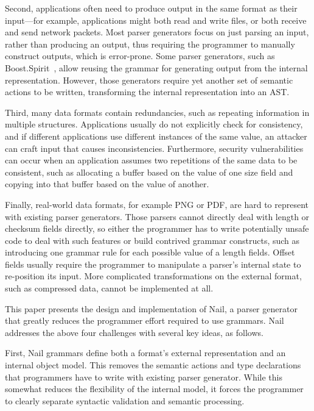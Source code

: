 Second,  applications often need to produce output in the same
format as their input---for example, applications might both
read and write files, or both receive and send network packets.
Most parser generators focus on just parsing an input, rather
than producing an output, thus requiring the programmer to manually
construct outputs, which is error-prone.  Some parser generators, such as
Boost.Spirit~\cite{boost-spirit},
allow reusing the grammar for generating output from the internal
representation.  However, those generators require yet another set of
semantic actions to be written, transforming the internal representation
into an AST\@.

Third, many data formats contain redundancies, such as repeating information in multiple structures.
Applications usually do not explicitly check for consistency, and if different applications use
different instances of the same value, an attacker can craft input that causes inconsistencies.
Furthermore, security vulnerabilities can occur when an application assumes two repetitions of the
same data to be consistent, such as allocating a buffer based on the value of one size field and copying into
that buffer based on the value of another.

Finally, real-world data formats, for example PNG or PDF,  are hard to represent with
existing parser generators. Those parsers cannot directly deal with length or checksum fields
directly, so either the programmer has to write potentially unsafe code to deal with such features
or build contrived grammar constructs, such as introducing one grammar rule for each possible value
of a length fields. Offset fields usually require the programmer to manipulate a parser's internal
state to re-position its input. More complicated transformations on the external format, such as
compressed data, cannot be implemented at all.



This paper presents the design and implementation of Nail, a parser generator that greatly reduces
the programmer effort required to use grammars. Nail addresses the above four challenges with
several key ideas, as follows.

First, Nail grammars define both a format's external representation and an internal object model.
This removes the semantic actions and type declarations that programmers have to write with existing
parser generator. While this somewhat reduces the flexibility of the internal model, it forces the programmer
to clearly separate syntactic validation and semantic processing.

